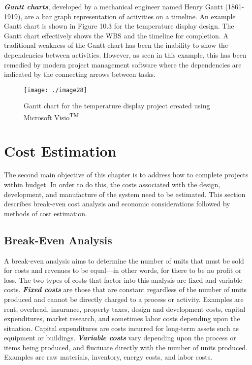 \emph{\textbf{Gantt charts}}, developed by a mechanical engineer named
Henry Gantt (1861-1919), are a bar graph representation of activities on
a timeline. An example Gantt chart is shown in Figure 10.3 for the
temperature display design. The Gantt chart effectively shows the WBS
and the timeline for completion. A traditional weakness of the Gantt
chart has been the inability to show the dependencies between
activities. However, as seen in this example, this has been remedied by
modern project management software where the dependencies are indicated
by the connecting arrows between tasks.

\begin{figure}
\texttt{[image: ./image28]}
\caption{Gantt chart for the temperature display project
created using Microsoft Visio\textsuperscript{TM}}
\label{figure:ghantChart}
\end{figure}


\section{Cost Estimation}
\label{section:cost-estimation}

The second main objective of this chapter is to address how to complete
projects within budget. In order to do this, the costs associated with
the design, development, and manufacture of the system need to be
estimated. This section describes break-even cost analysis and economic
considerations followed by methods of cost estimation.

\subsection{Break-Even Analysis}
\label{subsection:break-even-analysis}

A break-even analysis aims to determine the number of units that must be
sold for costs and revenues to be equal---in other words, for there to
be no profit or loss. The two types of costs that factor into this
analysis are fixed and variable costs. \emph{\textbf{Fixed costs}} are
those that are constant regardless of the number of units produced and
cannot be directly charged to a process or activity. Examples are rent,
overhead, insurance, property taxes, design and development costs,
capital expenditures, market research, and sometimes labor costs
depending upon the situation. Capital expenditures are costs incurred
for long-term assets such as equipment or buildings.
\emph{\textbf{Variable costs}} vary depending upon the process or items
being produced, and fluctuate directly with the number of units
produced. Examples are raw materials, inventory, energy costs, and labor
costs.

